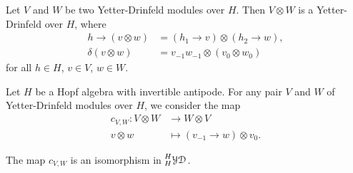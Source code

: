\begin{exercise}\label{exercise:YD_tensor}
Let $V$ and $W$ be two Yetter-Drinfeld modules over $H$. Then $V\otimes W$ is a
Yetter-Drinfeld over $H$, where 
\begin{align*}
h\rightarrow(v\otimes w) & =(h_{1}\rightarrow v)\otimes(h_{2}\rightarrow w),\\
\delta(v\otimes w) & =v_{-1}w_{-1}\otimes(v_{0}\otimes w_{0})
\end{align*}
for all $h\in H$, $v\in V$, $w\in W$.
\end{exercise}

Let $H$ be a Hopf algebra with invertible antipode. For any pair $V$ and $W$ of
Yetter-Drinfeld modules over $H$, we consider the map 
\begin{align*}
c_{V,W}:V\otimes W&\to W\otimes V\\
v\otimes w&\mapsto (v_{-1}\rightarrow w)\otimes v_{0}.
\end{align*}

\begin{lemma}
The map $c_{V,W}$ is an isomorphism in $\prescript{H}{H}{\mathcal{YD}}$.
\end{lemma}

